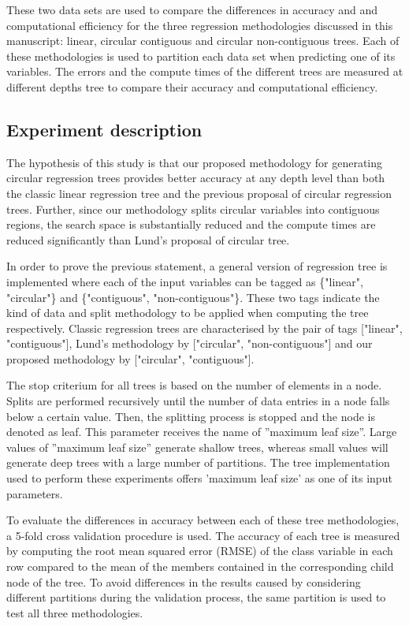 \documentclass[times,twocolumn,final,authoryear]{elsarticle}
\begin{document}
These two data sets are used to compare the differences in accuracy and and computational efficiency for the three regression methodologies discussed in this manuscript: linear, circular contiguous and circular non-contiguous trees. Each of these methodologies is used to partition each data set when predicting one of its variables. The errors and the compute times of the different trees are measured at different depths tree to compare their accuracy and computational efficiency.

\subsection{Experiment description}

The hypothesis of this study is that our proposed methodology for generating circular regression trees provides better accuracy at any depth level than both the classic linear regression tree and the previous proposal of circular regression trees. Further, since our methodology splits circular variables into contiguous regions, the search space is substantially reduced and the compute times are reduced significantly than Lund's proposal of circular tree.

In order to prove the previous statement, a general version of regression tree is implemented where each of the input variables can be tagged as \{"linear", "circular"\} and \{"contiguous", "non-contiguous"\}. These two tags indicate the kind of data and split methodology to be applied when computing the tree respectively. Classic regression trees are characterised by the pair of tags ["linear", "contiguous"], Lund's methodology by ["circular", "non-contiguous"] and our proposed methodology by ["circular", "contiguous"].

The stop criterium for all trees is based on the number of elements in a node. Splits are performed recursively until the number of data entries in a node falls below a certain value. Then, the splitting process is stopped and the node is denoted as leaf. This parameter receives the name of ”maximum leaf size”. Large values of ”maximum leaf size” generate shallow trees, whereas small values will generate deep trees with a large number of partitions. The tree implementation used to perform these experiments offers 'maximum leaf size' as one of its input parameters.

To evaluate the differences in accuracy between each of these tree methodologies, a 5-fold cross validation procedure is used. The accuracy of each tree is measured by computing the root mean squared error (RMSE) of the class variable in each row compared to the mean of the members contained in the corresponding child node of the tree. To avoid differences in the results caused by considering different partitions during the validation process, the same partition is used to test all three methodologies.
\end{document}
